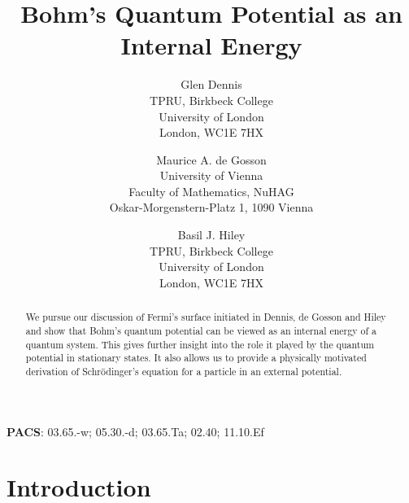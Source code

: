 \documentclass[11pt]{article}%
\begin{document}
\title{Bohm's Quantum Potential as an Internal Energy}
\author{Glen Dennis\\TPRU, Birkbeck College\\University of London\\London, WC1E 7HX
\and Maurice A. de Gosson\\University of Vienna\\Faculty of Mathematics, NuHAG\\Oskar-Morgenstern-Platz 1, 1090 Vienna
\and Basil J. Hiley\\TPRU, Birkbeck College\\University of London\\London, WC1E 7HX}
\maketitle

\begin{abstract}
We pursue our discussion of Fermi's surface initiated in Dennis, de Gosson and
Hiley and show that Bohm's quantum potential can be viewed as an internal
energy of a quantum system. This gives further insight into the role it played
by the quantum potential in stationary states. It also allows us to provide a
physically motivated derivation of Schr\"{o}dinger's equation for a particle
in an external potential.

\end{abstract}

\noindent\textbf{PACS}: 03.65.-w; 05.30.-d; 03.65.Ta; 02.40; 11.10.Ef

\section{Introduction}
\end{document}
